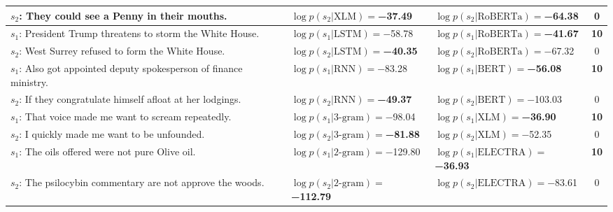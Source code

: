 \begin{tabularx}{\textwidth}{lllc}
                     $s_2$: They could see a Penny in their mouths. &      $\log p(s_2 | \textrm{XLM})=$\textbf{\num{-37.49}} &           $\log p(s_2 | \textrm{RoBERTa})=$\num{-64.38} &            \num{0} \\\midrule
         $s_1$: President Trump threatens to storm the White House. &              $\log p(s_1 | \textrm{LSTM})=$\num{-58.78} &  $\log p(s_1 | \textrm{RoBERTa})=$\textbf{\num{-41.67}} &  \textbf{\num{10}} \\
                $s_2$: West Surrey refused to form the White House. &     $\log p(s_2 | \textrm{LSTM})=$\textbf{\num{-40.35}} &           $\log p(s_2 | \textrm{RoBERTa})=$\num{-67.32} &            \num{0} \\\midrule
 $s_1$: Also got appointed deputy spokesperson of finance ministry. &               $\log p(s_1 | \textrm{RNN})=$\num{-83.28} &     $\log p(s_1 | \textrm{BERT})=$\textbf{\num{-56.08}} &  \textbf{\num{10}} \\
        $s_2$: If they congratulate himself afloat at her lodgings. &      $\log p(s_2 | \textrm{RNN})=$\textbf{\num{-49.37}} &             $\log p(s_2 | \textrm{BERT})=$\num{-103.03} &            \num{0} \\\midrule
               $s_1$: That voice made me want to scream repeatedly. &            $\log p(s_1 | \textrm{3-gram})=$\num{-98.04} &      $\log p(s_1 | \textrm{XLM})=$\textbf{\num{-36.90}} &  \textbf{\num{10}} \\
                     $s_2$: I quickly made me want to be unfounded. &   $\log p(s_2 | \textrm{3-gram})=$\textbf{\num{-81.88}} &               $\log p(s_2 | \textrm{XLM})=$\num{-52.35} &            \num{0} \\\midrule
                   $s_1$: The oils offered were not pure Olive oil. &           $\log p(s_1 | \textrm{2-gram})=$\num{-129.80} &  $\log p(s_1 | \textrm{ELECTRA})=$\textbf{\num{-36.93}} &  \textbf{\num{10}} \\
        $s_2$: The psilocybin commentary are not approve the woods. &  $\log p(s_2 | \textrm{2-gram})=$\textbf{\num{-112.79}} &           $\log p(s_2 | \textrm{ELECTRA})=$\num{-83.61} &            \num{0} \\
\bottomrule
\end{tabularx}
